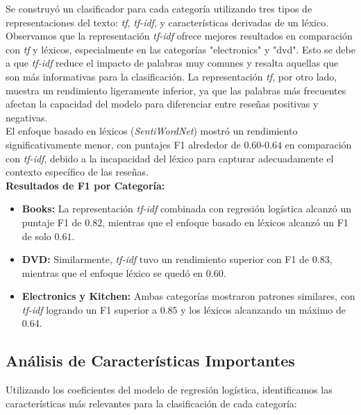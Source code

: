\documentclass[11pt,english]{article}
\theoremstyle{plain}
\begin{document}
Se construyó un clasificador para cada categoría utilizando tres tipos de representaciones del texto: \textit{tf}, \textit{tf-idf}, y características derivadas de un léxico.\\

\noindent Observamos que la representación \textit{tf-idf} ofrece mejores resultados en comparación con \textit{tf} y léxicos, especialmente en las categorías "electronics" y "dvd". Esto se debe a que \textit{tf-idf} reduce el impacto de palabras muy comunes y resalta aquellas que son más informativas para la clasificación. La representación \textit{tf}, por otro lado, muestra un rendimiento ligeramente inferior, ya que las palabras más frecuentes afectan la capacidad del modelo para diferenciar entre reseñas positivas y negativas.\\

\noindent El enfoque basado en léxicos (\textit{SentiWordNet}) mostró un rendimiento significativamente menor, con puntajes F1 alrededor de $0.60$-$0.64$ en comparación con \textit{tf-idf}, debido a la incapacidad del léxico para capturar adecuadamente el contexto específico de las reseñas.\\

\textbf{Resultados de F1 por Categoría:}

\begin{itemize}
    \item \textbf{Books:} La representación \textit{tf-idf} combinada con regresión logística alcanzó un puntaje F1 de $0.82$, mientras que el enfoque basado en léxicos alcanzó un F1 de solo $0.61$.
    \item \textbf{DVD:} Similarmente, \textit{tf-idf} tuvo un rendimiento superior con F1 de $0.83$, mientras que el enfoque léxico se quedó en $0.60$.
    \item \textbf{Electronics y Kitchen:} Ambas categorías mostraron patrones similares, con \textit{tf-idf} logrando un F1 superior a $0.85$ y los léxicos alcanzando un máximo de $0.64$.
\end{itemize}

\subsection{Análisis de Características Importantes}

Utilizando los coeficientes del modelo de regresión logística, identificamos las características más relevantes para la clasificación de cada categoría:
\end{document}
